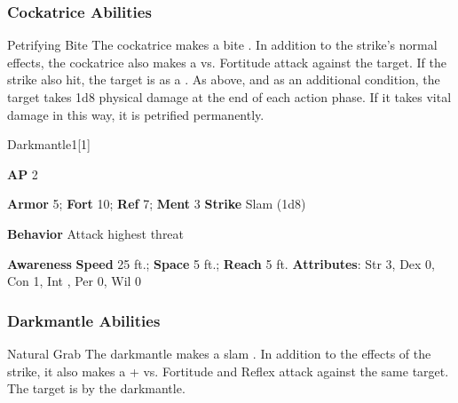 \subsubsection{Cockatrice Abilities}

\begin{ability}{Petrifying Bite}
The cockatrice makes a bite .
In addition to the strike's normal effects, the cockatrice also makes a  vs. Fortitude attack against the target.
\hit If the strike also hit, the target is  as a .
\crit As above, and as an additional condition, the target takes 1d8 physical damage at the end of each action phase.
If it takes vital damage in this way, it is petrified permanently.
\end{ability}

\begin{monsection}{Darkmantle}{1}[1]
\vspace{-1em}\vspace{-1em}
\begin{spellcontent}
\begin{spelltargetinginfo}
{\textbf{AP} 2}

\pari \textbf{Armor} 5;
\textbf{Fort} 10;
\textbf{Ref} 7;
\textbf{Ment} 3
\pari \textbf{Strike} Slam  (1d8)



\pari \textbf{Behavior} Attack highest threat
\end{spelltargetinginfo}
\end{spellcontent}

\begin{monsterfooter}
\pari \textbf{Awareness} 
\pari \textbf{Speed} 25 ft.;
\textbf{Space} 5 ft.;
\textbf{Reach} 5 ft.
\pari \textbf{Attributes}:
Str 3,
Dex 0,
Con 1,
Int ,
Per 0,
Wil 0
\end{monsterfooter}
\end{monsection}


\subsubsection{Darkmantle Abilities}

\begin{ability}{Natural Grab}
The darkmantle makes a slam .
In addition to the effects of the strike, it also makes a + vs. Fortitude and Reflex attack against the same target.
\hit The target is  by the darkmantle.
\end{ability}

